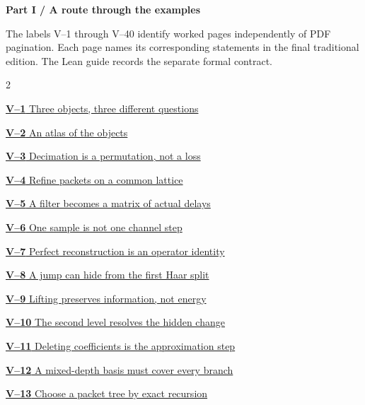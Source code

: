 \documentclass[11pt,a4paper]{article}
\begin{document}
\KomorebiCover
{}


{\sffamily\bfseries\Large\color{accent}Part I / A route through the examples}\par\medskip
The labels V--1 through V--40 identify worked pages independently of PDF
pagination. Each page names its corresponding statements in the final
traditional edition. The Lean guide records the separate formal contract.
\medskip
\begin{multicols}{2}
{\small\noindent\hyperlink{vpage1}{\textbf{V--1} Three objects, three different questions}\par\smallskip}
{\small\noindent\hyperlink{vpage2}{\textbf{V--2} An atlas of the objects}\par\smallskip}
{\small\noindent\hyperlink{vpage3}{\textbf{V--3} Decimation is a permutation, not a loss}\par\smallskip}
{\small\noindent\hyperlink{vpage4}{\textbf{V--4} Refine packets on a common lattice}\par\smallskip}
{\small\noindent\hyperlink{vpage5}{\textbf{V--5} A filter becomes a matrix of actual delays}\par\smallskip}
{\small\noindent\hyperlink{vpage6}{\textbf{V--6} One sample is not one channel step}\par\smallskip}
{\small\noindent\hyperlink{vpage7}{\textbf{V--7} Perfect reconstruction is an operator identity}\par\smallskip}
{\small\noindent\hyperlink{vpage8}{\textbf{V--8} A jump can hide from the first Haar split}\par\smallskip}
{\small\noindent\hyperlink{vpage9}{\textbf{V--9} Lifting preserves information, not energy}\par\smallskip}
{\small\noindent\hyperlink{vpage10}{\textbf{V--10} The second level resolves the hidden change}\par\smallskip}
{\small\noindent\hyperlink{vpage11}{\textbf{V--11} Deleting coefficients is the approximation step}\par\smallskip}
{\small\noindent\hyperlink{vpage12}{\textbf{V--12} A mixed-depth basis must cover every branch}\par\smallskip}
{\small\noindent\hyperlink{vpage13}{\textbf{V--13} Choose a packet tree by exact recursion}\par\smallskip}

\end{multicols}
\end{document}
